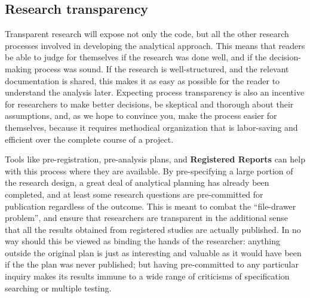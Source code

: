 \subsection{Research transparency}

Transparent research will expose not only the code,
but all the other research processes involved in developing the analytical approach.
This means that readers be able to judge for themselves if the research was done well,
and if the decision-making process was sound.
If the research is well-structured, and the relevant documentation is shared,
this makes it as easy as possible for the reader to understand the analysis later.
Expecting process transparency is also an incentive for researchers to make better decisions,
be skeptical and thorough about their assumptions,
and, as we hope to convince you, make the process easier for themselves,
because it requires methodical organization that is labor-saving and efficient over the complete course of a project.

Tools like pre-registration, pre-analysis plans, and
\textbf{Registered Reports}
can help with this process where they are available.
By pre-specifying a large portion of the research design,
a great deal of analytical planning has already been completed,
and at least some research questions are pre-committed for publication regardless of the outcome.
This is meant to combat the ``file-drawer problem'',\cite{simonsohn2014p}
and ensure that researchers are transparent in the additional sense that
all the results obtained from registered studies are actually published.
In no way should this be viewed as binding the hands of the researcher:
anything outside the original plan is just as interesting and valuable
as it would have been if the the plan was never published;
but having pre-committed to any particular inquiry makes its results
immune to a wide range of criticisms of specification searching or multiple testing.


